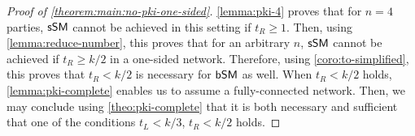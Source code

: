 \begin{proof}[Proof of \cref{theorem:main:no-pki-one-sided}]
\cref{lemma:pki-4} proves that for $n = 4$ parties, $\textsf{sSM}$ cannot be achieved in this setting if $t_R \geq 1$.
Then, using \cref{lemma:reduce-number}, this proves that for an arbitrary $n$, $\textsf{sSM}$ cannot be achieved if $t_R \geq k/2$ in a one-sided network. Therefore, using \cref{coro:to-simplified}, this proves that $t_R < k/2$ is necessary for $\textsf{bSM}$ as well.
When $t_R < k / 2$ holds, \cref{lemma:pki-complete} enables us to assume a fully-connected network. Then, we may conclude using \cref{theo:pki-complete} that it is both necessary and sufficient that one of the conditions $t_L < k/3$, $t_R < k/2$ holds.
\end{proof}

